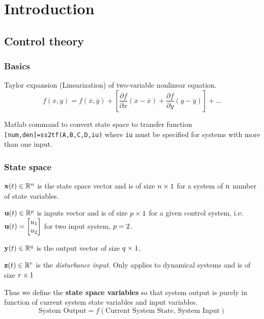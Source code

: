 \chapter{Introduction}

\section{Control theory}
\subsection{Basics}
Taylor expansion (Linearization) of two-variable nonlinear equation.
\[
f(x,y) = f(\overline{x},\overline{y}) + \left[ \frac{\partial f}{\partial x} (x-\overline{x}) +\frac{\partial f}{\partial y} (y-\overline{y}) \right] + \ldots
\]

Matlab command to convert state space to transfer function \verb|[num,den]=ss2tf(A,B,C,D,iu)| where \verb|iu| must be specified for systems with more than one input.

\subsection{State space}
\(\mathbf{x}(t) \in \mathbb{R}^{n} \) is the state space vector and is of size \(n\times 1\) for a system of $n$ number of state variables.

\(\mathbf{u}(t)\in \mathbb{R}^{p} \) is inputs vector and is of size \(p\times 1\) for a given control system, i.e: \( \mathbf{u}(t)=\begin{bmatrix}
u_1 \\ u_2
\end{bmatrix}\) for two input system, \(p=2\).

\(\mathbf{y}(t)\in \mathbb{R}^{q}  \) is the output vector of size  \(q\times 1\).

\(\mathbf{z}(t)\in \mathbb{R}^{r} \) is the \textit{disturbance input}. Only applies to dynamical systems and is of size \(r \times 1\)

Thus we define the \textbf{state space variables} so that system output is purely in function of current system state variables and input variables.
\[
\text{System Output} = f\left( \text{Current System State, System Input} \right)
\]

